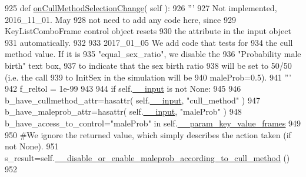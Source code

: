 \begin{DoxyCode}
925     \textcolor{keyword}{def }\hyperlink{classnegui_1_1pgguisimupop__experimental2_1_1PGGuiSimuPop_a11cf5050ac71b9585050e6b795eb9ce6}{onCullMethodSelectionChange}( self ):
926         \textcolor{stringliteral}{'''}
927 \textcolor{stringliteral}{        Not implemented, 2016\_11\_01.  May}
928 \textcolor{stringliteral}{        not need to add any code here, since}
929 \textcolor{stringliteral}{        KeyListComboFrame control object resets}
930 \textcolor{stringliteral}{        the attribute in the input object}
931 \textcolor{stringliteral}{        automatically.}
932 \textcolor{stringliteral}{}
933 \textcolor{stringliteral}{        2017\_01\_05  We add code that tests for}
934 \textcolor{stringliteral}{        the cull method value.  If it is }
935 \textcolor{stringliteral}{        "equal\_sex\_ratio", we disable the}
936 \textcolor{stringliteral}{        "Probability male birth" text box,}
937 \textcolor{stringliteral}{        to indicate that the sex birth ratio}
938 \textcolor{stringliteral}{        will be set to 50/50 (i.e. the call}
939 \textcolor{stringliteral}{        to InitSex in the simulation will be}
940 \textcolor{stringliteral}{        maleProb=0.5).}
941 \textcolor{stringliteral}{        '''}
942         f\_reltol = 1e-99    
943 
944         \textcolor{keywordflow}{if} self.\hyperlink{classnegui_1_1pgguisimupop__experimental2_1_1PGGuiSimuPop_a69deac7dfed31f2ba496671465ee4d1c}{\_\_input} \textcolor{keywordflow}{is} \textcolor{keywordflow}{not} \textcolor{keywordtype}{None}:
945 
946             b\_have\_cullmethod\_attr=hasattr( self.\hyperlink{classnegui_1_1pgguisimupop__experimental2_1_1PGGuiSimuPop_a69deac7dfed31f2ba496671465ee4d1c}{\_\_input}, \textcolor{stringliteral}{"cull\_method"} )
947             b\_have\_maleprob\_attr=hasattr(  self.\hyperlink{classnegui_1_1pgguisimupop__experimental2_1_1PGGuiSimuPop_a69deac7dfed31f2ba496671465ee4d1c}{\_\_input}, \textcolor{stringliteral}{"maleProb"} )
948             b\_have\_access\_to\_control=\textcolor{stringliteral}{"maleProb"} \textcolor{keywordflow}{in} self.\hyperlink{classnegui_1_1pgguisimupop__experimental2_1_1PGGuiSimuPop_a08bb009e9a24284adfbd8a38dcc0c861}{\_\_param\_key\_value\_frames}
949 
950             \textcolor{comment}{#We ignore the returned value, which simply describes the action taken (if not None).}
951             s\_result=self.\hyperlink{classnegui_1_1pgguisimupop__experimental2_1_1PGGuiSimuPop_acfca30cb65c4fd8b6e2db1f4f7f0a729}{\_\_disable\_or\_enable\_maleprob\_according\_to\_cull\_method}
      ()
952 

\end{DoxyCode}
